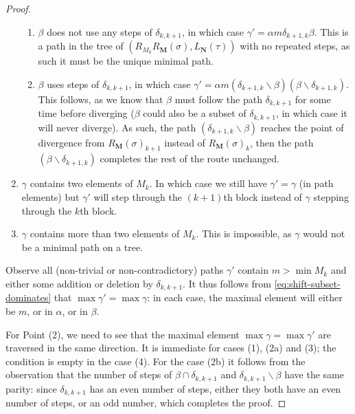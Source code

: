 \documentclass{amsart}
\theoremstyle{definition}
\newcommand{\ssm}{\smallsetminus} %
\begin{document}
\begin{proof}
\begin{enumerate}
\begin{enumerate}
        \item $\beta$ does not use any steps of $\delta_{k,k+1}$, in which case $\gamma' = \alpha m \delta_{k+1,k} \beta$.
        This is a path in the tree of $(R_{M_k}R_{\mathbf{M}}(\sigma),L_{\mathbf{N}}(\tau))$ with no repeated steps, as such it must be the unique minimal path. 
        
        \item $\beta$ uses steps of $\delta_{k,k+1}$, in which case $\gamma' = \alpha m (\delta_{k+1,k}\ssm \beta)(\beta \ssm \delta_{k+1,k})$.
        This follows, as we know that $\beta$ must follow the path $\delta_{k,k+1}$ for some time before diverging ($\beta$ could also be a subset of $\delta_{k,k+1}$, in which case it will never diverge).
        As such, the path $(\delta_{k+1,k}\ssm \beta)$ reaches the point of divergence from $R_{\mathbf{M}}(\sigma)_{k+1}$ instead of $R_{\mathbf{M}}(\sigma)_{k}$, then the path $(\beta \ssm \delta_{k+1,k})$ completes the rest of the route unchanged.

    \end{enumerate}

    \item $\gamma$ contains two elements of $M_k$. In which case we still have $\gamma'=\gamma$ (in path elements) but $\gamma'$ will step through the $(k+1)$th block instead of $\gamma$ stepping through the $k$th block.
    
    \item $\gamma$ contains more than two elements of $M_k$. 
    This is impossible, as $\gamma$ would not be a minimal path on a tree.

\end{enumerate}
Observe all (non-trivial or non-contradictory) paths $\gamma'$ contain $m>\min M_k$ and either some addition or deletion by $\delta_{k,k+1}$.
It thus follows from \cref{eq:shift-subset-dominates} that $\max \gamma' = \max \gamma$: in each case, the maximal element will either be $m$, or in $\alpha$, or in $\beta$.

For Point (2), we need to see that the maximal element $\max \gamma = \max \gamma'$ are traversed in the same direction.
It is immediate for cases (1), (2a) and (3); the condition is empty in the case (4).
For the case (2b) it follows from the observation that the number of steps of $\beta \cap \delta_{k,k+1}$ and $\delta_{k,k+1} \ssm \beta$ have the same parity: since $\delta_{k,k+1}$ has an even number of steps, either they both have an even number of steps, or an odd number, which completes the proof.
\end{proof}
\end{document}
